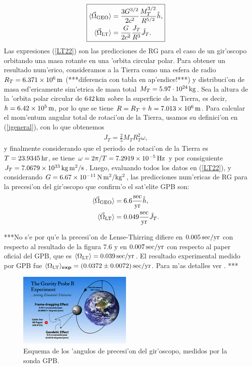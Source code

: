 \begin{equation}\boxed{
\begin{aligned}
\langle\vec{\Omega}_{\rm GEO}\rangle={}&\frac{3G^{3/2}}{2c^2}\frac{M_T^{3/2}}{R^{5/2}}\hat{h},\\
\langle\vec{\Omega}_{\rm LT}\rangle={}&\frac{G}{2c^2}\frac{J_T}{R^3}\hat{J}_T.\label{LT22}
\end{aligned}}
\end{equation}
Las expresiones (\ref{LT22}) son las predicciones de RG para el caso de un gir'oscopo orbitando una masa rotante en una 'orbita circular polar. Para obtener un resultado num'erico, consideramos a la Tierra como una esfera de radio $R_T=6.371\times 10^6\,\rm m$ (***diferencia con tabla en ap'endice!***) y distribuci'on de masa esf'ericamente sim'etrica de masa total $M_T=5.97\cdot 10^{24}\,\rm kg$. Sea la altura de la 'orbita polar circular de $642\,\rm km$ sobre la superficie de la Tierra, es decir, $h=6.42\times 10^5 \,\rm m$, por lo que se tiene $R=R_T+h=7.013\times 10^{6}\,\rm m$. Para calcular el mom'entum angular total de rotaci'on de la Tierra, usamos su definici'on en (\ref{jgeneral}), con lo que obtenemos
\begin{align}
J_T=\frac{2}{5}M_TR_T^2\omega,
\end{align}
y finalmente considerando que el periodo de rotaci'on de la Tierra es $T=23.9345\,\rm hr$, se tiene $\omega=2\pi/T=7.2919\times 10^{-5}\,\rm Hz$ y por consiguiente $J_T=7.0679\times 10^{33}\,\rm kg\,m^2/s$.
Luego, evaluando todos los datos en (\ref{LT22}), y considerando $G=6.67\times 10^{-11}\,\rm N\,m^2/kg^2$, las predicciones num'ericas de RG para la precesi'on del gir'oscopo que confirm'o el sat'elite GPB son:
\begin{align}
\langle\vec{\Omega}_{\rm GEO}\rangle={}&6.6{\rm \frac{sec}{yr}}\hat{h},\\
\langle\vec{\Omega}_{\rm LT}\rangle={}&0.049{\rm \frac{sec}{yr}}\hat{J}_T.
\end{align}

***No s'e por qu'e la precesi'on de Lense-Thirring difiere en $0.005\,\rm sec/yr$ con respecto al resultado de la figura 7.6 y en $0.007\,\rm sec/yr$ con respecto al paper oficial del GPB, que es $\langle\Omega_{\rm LT}\rangle=0.039\,\rm sec/yr$. El resultado experimental medido por GPB fue $\langle\Omega_{\rm LT}{}\rangle_{\rm\bf exp}=(0.0372\pm 0.0072)\,\rm sec/yr$. Para m'as detalles ver \cite{Everitt11}. ***

\begin{figure}[H]
\centering
\includegraphics[angle=0,width=0.5\textwidth]{fig/fig-precesion.pdf}
\caption{Esquema de los 'angulos de precesi'on del gir'oscopo, medidos por la sonda GPB.}
\label{precesion}
\end{figure}